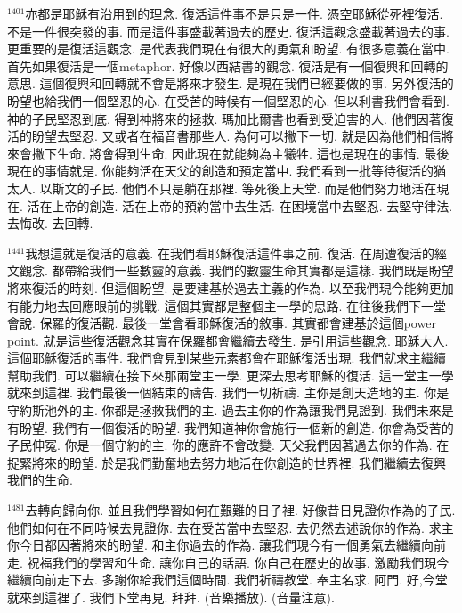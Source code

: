 \documentclass{book}
\begin{document}
$^{1401}$亦都是耶穌有沿用到的理念.
復活這件事不是只是一件.
憑空耶穌從死裡復活.
不是一件很突發的事.
而是這件事盛載著過去的歷史.
復活這觀念盛載著過去的事.
更重要的是復活這觀念.
是代表我們現在有很大的勇氣和盼望.
有很多意義在當中.
首先如果復活是一個metaphor.
好像以西結書的觀念.
復活是有一個復興和回轉的意思.
這個復興和回轉就不會是將來才發生.
是現在我們已經要做的事.
另外復活的盼望也給我們一個堅忍的心.
在受苦的時候有一個堅忍的心.
但以利書我們會看到.
神的子民堅忍到底.
得到神將來的拯救.
瑪加比爾書也看到受迫害的人.
他們因著復活的盼望去堅忍.
又或者在福音書那些人.
為何可以撇下一切.
就是因為他們相信將來會撇下生命.
將會得到生命.
因此現在就能夠為主犧牲.
這也是現在的事情.
最後現在的事情就是.
你能夠活在天父的創造和預定當中.
我們看到一批等待復活的猶太人.
以斯文的子民.
他們不只是躺在那裡.
等死後上天堂.
而是他們努力地活在現在.
活在上帝的創造.
活在上帝的預約當中去生活.
在困境當中去堅忍.
去堅守律法.
去悔改.
去回轉.

$^{1441}$我想這就是復活的意義.
在我們看耶穌復活這件事之前.
復活.
在周遭復活的經文觀念.
都帶給我們一些數靈的意義.
我們的數靈生命其實都是這樣.
我們既是盼望將來復活的時刻.
但這個盼望.
是要建基於過去主義的作為.
以至我們現今能夠更加有能力地去回應眼前的挑戰.
這個其實都是整個主一學的思路.
在往後我們下一堂會說.
保羅的復活觀.
最後一堂會看耶穌復活的敘事.
其實都會建基於這個power point.
就是這些復活觀念其實在保羅都會繼續去發生.
是引用這些觀念.
耶穌大人.
這個耶穌復活的事件.
我們會見到某些元素都會在耶穌復活出現.
我們就求主繼續幫助我們.
可以繼續在接下來那兩堂主一學.
更深去思考耶穌的復活.
這一堂主一學就來到這裡.
我們最後一個結束的禱告.
我們一切祈禱.
主你是創天造地的主.
你是守約斯池外的主.
你都是拯救我們的主.
過去主你的作為讓我們見證到.
我們未來是有盼望.
我們有一個復活的盼望.
我們知道神你會施行一個新的創造.
你會為受苦的子民伸冤.
你是一個守約的主.
你的應許不會改變.
天父我們因著過去你的作為.
在捉緊將來的盼望.
於是我們勤奮地去努力地活在你創造的世界裡.
我們繼續去復興我們的生命.

$^{1481}$去轉向歸向你.
並且我們學習如何在艱難的日子裡.
好像昔日見證你作為的子民.
他們如何在不同時候去見證你.
去在受苦當中去堅忍.
去仍然去述說你的作為.
求主你今日都因著將來的盼望.
和主你過去的作為.
讓我們現今有一個勇氣去繼續向前走.
祝福我們的學習和生命.
讓你自己的話語.
你自己在歷史的故事.
激勵我們現今繼續向前走下去.
多謝你給我們這個時間.
我們祈禱教堂.
奉主名求.
阿門.
好,今堂就來到這裡了.
我們下堂再見.
拜拜.
(音樂播放).
(音量注意).
\newpage
\end{document}
